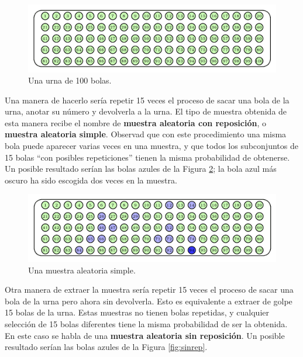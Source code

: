 \documentclass[
]{book}
\theoremstyle{definition}
\theoremstyle{definition}
\theoremstyle{definition}
\theoremstyle{definition}
\theoremstyle{remark}
\begin{document}
\begin{figure}

{\centering \includegraphics[width=0.8\linewidth]{INREMDN_files/figure-html/basev} 

}

\caption{Una urna de 100 bolas.}\label{fig:base}
\end{figure}

Una manera de hacerlo sería repetir 15 veces el proceso de sacar una bola de la urna, anotar su número y devolverla a la urna. El tipo de muestra obtenida de esta manera recibe el nombre de \textbf{muestra aleatoria con reposición}, o \textbf{muestra aleatoria simple}. Observad que con este procedimiento una misma bola puede aparecer varias veces en una muestra, y que todos los subconjuntos de 15 bolas ``con posibles repeticiones'' tienen la misma probabilidad de obtenerse. Un posible resultado serían las bolas azules de la Figura \ref{fig:simple}; la bola azul más oscuro ha sido escogida dos veces en la muestra.

\begin{figure}

{\centering \includegraphics[width=0.8\linewidth]{INREMDN_files/figure-html/simplev} 

}

\caption{Una muestra aleatoria simple.}\label{fig:simple}
\end{figure}

Otra manera de extraer la muestra sería repetir 15 veces el proceso de sacar una bola de la urna pero ahora sin devolverla. Esto es equivalente a extraer de golpe 15 bolas de la urna. Estas muestras no tienen bolas repetidas, y cualquier selección de 15 bolas diferentes tiene la misma probabilidad de ser la obtenida. En este caso se habla de una \textbf{muestra aleatoria sin reposición}. Un posible resultado serían las bolas azules de la Figura \ref{fig:sinrep}.
\end{document}
